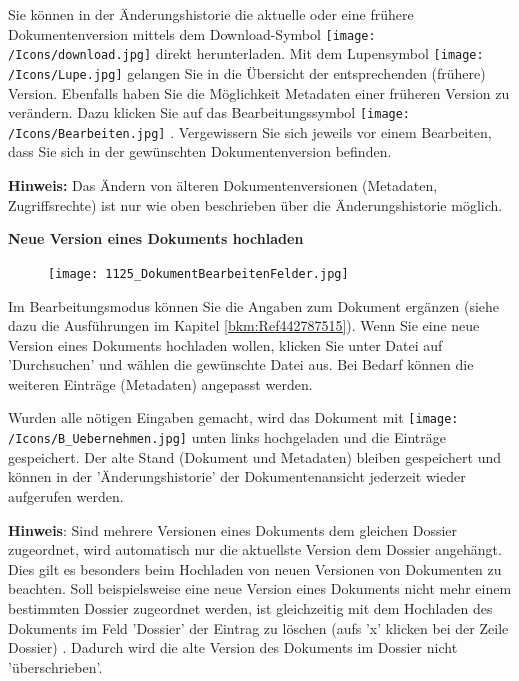 Sie können in der Änderungshistorie die aktuelle oder eine frühere Dokumentenversion mittels dem Download-Symbol \texttt{[image: /Icons/download.jpg]}  direkt herunterladen. Mit dem Lupensymbol \texttt{[image: /Icons/Lupe.jpg]}  gelangen Sie in die Übersicht der entsprechenden (frühere) Version. Ebenfalls haben Sie die Möglichkeit Metadaten einer früheren Version zu verändern. Dazu klicken Sie auf das Bearbeitungssymbol \texttt{[image: /Icons/Bearbeiten.jpg]} . Vergewissern Sie sich jeweils vor einem Bearbeiten, dass Sie sich in der gewünschten Dokumentenversion befinden.

\vspace{\baselineskip}

\textbf{Hinweis:} Das Ändern von älteren Dokumentenversionen (Metadaten, Zugriffsrechte) ist nur wie oben beschrieben über die Änderungshistorie möglich.

\pagebreak

\textbf{Neue Version eines Dokuments hochladen}

\vspace{\baselineskip}

\begin{figure}
\vspace{-35pt}
\texttt{[image: 1125\_DokumentBearbeitenFelder.jpg]}
\end{figure}
Im Bearbeitungsmodus können Sie die Angaben zum Dokument ergänzen (siehe dazu die Ausführungen im Kapitel \ref{bkm:Ref442787515}). Wenn Sie eine neue Version eines Dokuments hochladen wollen, klicken Sie unter Datei auf 'Durchsuchen'  und wählen die gewünschte Datei aus. Bei Bedarf können die weiteren Einträge (Metadaten) angepasst werden.

\vspace{\baselineskip}

Wurden alle nötigen Eingaben gemacht, wird das Dokument mit \texttt{[image: /Icons/B\_Uebernehmen.jpg]} unten links hochgeladen und die Einträge gespeichert. Der alte Stand (Dokument und Metadaten) bleiben gespeichert und können in der 'Änderungshistorie' der Dokumentenansicht jederzeit wieder aufgerufen werden.

\vspace{\baselineskip}
\vspace{\baselineskip}

\textbf{Hinweis}: Sind mehrere Versionen eines Dokuments dem gleichen Dossier zugeordnet, wird automatisch nur die aktuellste Version dem Dossier angehängt. Dies gilt es besonders beim Hochladen von neuen Versionen von Dokumenten zu beachten. Soll beispielsweise eine neue Version eines Dokuments nicht mehr einem bestimmten Dossier zugeordnet werden, ist gleichzeitig mit dem Hochladen des Dokuments im Feld 'Dossier' der Eintrag zu löschen (aufs 'x' klicken bei der Zeile Dossier) . Dadurch wird die alte Version des Dokuments im Dossier nicht 'überschrieben'.

